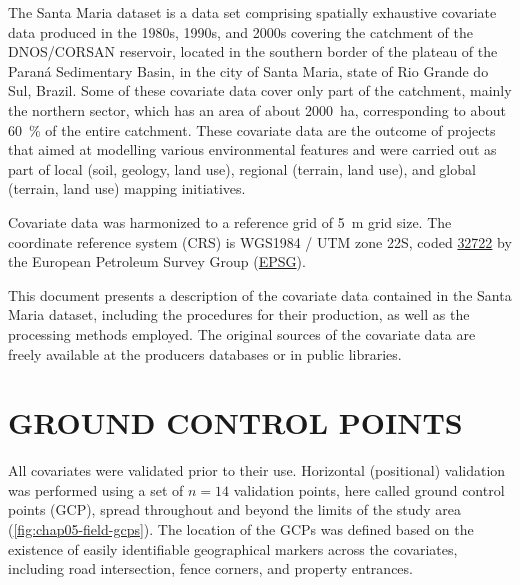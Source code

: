 The Santa Maria dataset is a data set comprising spatially exhaustive covariate data produced in the 1980s, 
1990s, and 2000s covering the catchment of the DNOS/CORSAN reservoir, located in the southern border of the 
plateau of the Paraná Sedimentary Basin, in the city of Santa Maria, state of Rio Grande do Sul, Brazil. Some 
of these covariate data cover only part of the catchment, mainly the northern sector, which has an area of 
about
\SI{2000}{\hectare}, corresponding to about \SI{60}{\percent} of the entire catchment. These covariate data 
are the outcome of projects that aimed at modelling various environmental features and were carried out as 
part of local (soil, geology, land use), regional (terrain, land use), and global (terrain, land use) mapping 
initiatives.

Covariate data was harmonized to a reference grid of \SI{5}{\m} grid size. The coordinate reference 
system (CRS) is WGS1984 / UTM zone 22S, coded \href{http://spatialreference.org/ref/epsg/32722/}{\num{32722}} 
by the European Petroleum Survey Group (\href{http://www.epsg.org/}{EPSG}).

This document presents a description of the covariate data contained in the Santa Maria dataset, including the 
procedures for their production, as well as the processing methods employed. The original sources of the 
covariate data are freely available at the producers databases or in public libraries.

\section{GROUND CONTROL POINTS}
\label{sec:chap05-gcp}

All covariates were validated prior to their use. Horizontal (positional) validation was performed using a set 
of $n = 14$ validation points, here called ground control points (GCP), spread throughout and beyond the 
limits of the study area (\autoref{fig:chap05-field-gcps}). The location of the GCPs was defined based on 
the existence of easily identifiable geographical markers across the covariates, including road intersection, 
fence corners, and property entrances.

